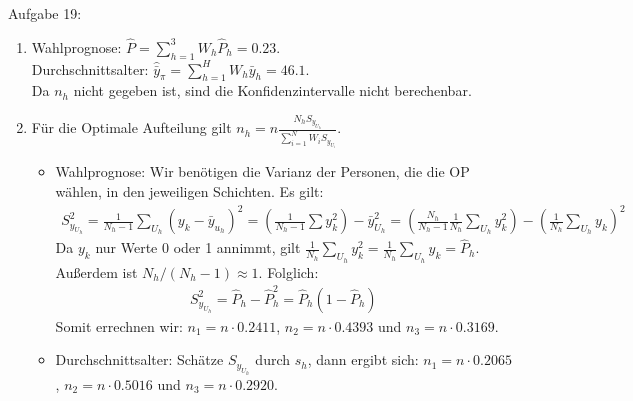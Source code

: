 \begin{Solution}{{Aufgabe 19:}}
	\begin{enumerate}
\item Wahlprognose: $\hat{P} = \sum_{h=1}^3 W_h \hat{P}_h = 0.23$.\\
Durchschnittsalter: $\hat{\bar{y}}_\pi=\sum_{h=1}^H W_h \bar{y}_h=46.1$.\\
Da $n_h$ nicht gegeben ist, sind die Konfidenzintervalle nicht berechenbar.
\item Für die Optimale Aufteilung gilt $n_h = n \frac{N_h S_{y_{U_h}}}{\sum_{i=1}^N W_i S_{y_{U_i}}}$.\\
\begin{itemize}
\item Wahlprognose: Wir benötigen die Varianz der Personen, die die OP wählen, in den jeweiligen Schichten. Es gilt:
\begin{align*}
S_{y_{U_h}}^2 = \frac{1}{N_h-1}\sum_{U_h}(y_k - \bar{y}_{u_h})^2 = \left(\frac{1}{N_h-1}\sum y_k^2\right) -\bar{y}_{U_h}^2 = \left(\frac{N_h}{N_h-1} \frac{1}{N_h}\sum_{U_h} y_k^2\right) - \left(\frac{1}{N_h}\sum_{U_h}y_k\right)^2
\end{align*}
Da $y_k$ nur Werte 0 oder 1 annimmt, gilt $\frac{1}{N_h}\sum_{U_h} y_k^2=\frac{1}{N_h}\sum_{U_h} y_k = \hat{P}_h$. Außerdem ist $N_h/(N_h-1)\approx 1$. Folglich:
\begin{align*}
S_{y_{U_h}}^2 = \hat{P}_h - \hat{P}_h^2 = \hat{P}_h(1-\hat{P}_h)
\end{align*}
Somit errechnen wir: $n_1= n\cdot 0.2411$, $n_2= n\cdot 0.4393$ und $n_3= n\cdot 0.3169$.

\item Durchschnittsalter: Schätze $S_{y_{U_h}}$ durch $s_h$, dann ergibt sich:
$n_1 = n\cdot 0.2065$, $n_2 = n\cdot 0.5016$ und $n_3 = n\cdot 0.2920$.
\end{itemize}
\end{enumerate}
\end{Solution}

